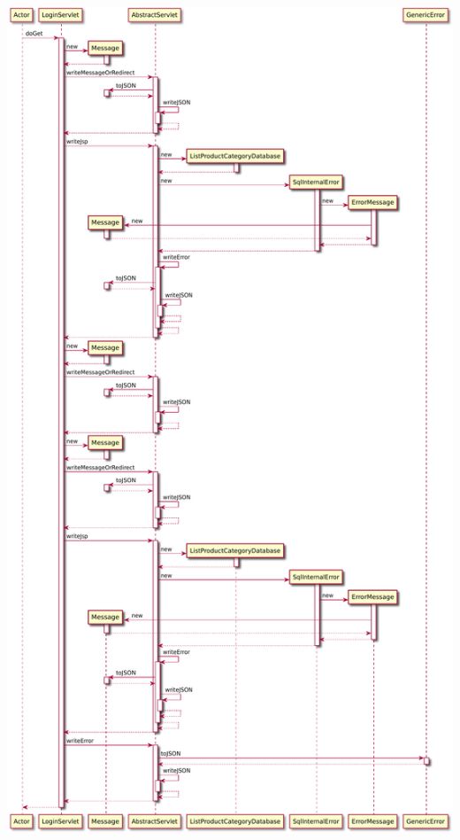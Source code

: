 \includegraphics[width=\textwidth,height=\textheight,keepaspectratio]{Schemas/LoginServlet_doGet.svg.pdf}


